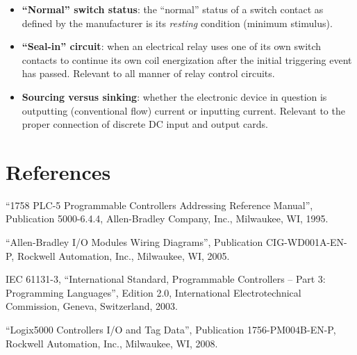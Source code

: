 \begin{itemize}
\item \textbf{``Normal'' switch status}: the ``normal'' status of a switch contact as defined by the manufacturer is its \textit{resting} condition (minimum stimulus).
\item \textbf{``Seal-in'' circuit}: when an electrical relay uses one of its own switch contacts to continue its own coil energization after the initial triggering event has passed.  Relevant to all manner of relay control circuits.
\item \textbf{Sourcing versus sinking}: whether the electronic device in question is outputting (conventional flow) current or inputting current.  Relevant to the proper connection of discrete DC input and output cards.
\end{itemize}













\filbreak
\section*{References}


\noindent
``1758 PLC-5 Programmable Controllers Addressing Reference Manual'', Publication 5000-6.4.4, Allen-Bradley Company, Inc., Milwaukee, WI, 1995.

\vskip 10pt

\noindent
``Allen-Bradley I/O Modules Wiring Diagrams'', Publication CIG-WD001A-EN-P, Rockwell Automation, Inc., Milwaukee, WI, 2005.

\vskip 10pt

\noindent
IEC 61131-3, ``International Standard, Programmable Controllers -- Part 3: Programming Languages'', Edition 2.0, International Electrotechnical Commission, Geneva, Switzerland, 2003.

\vskip 10pt

\noindent
``Logix5000 Controllers I/O and Tag Data'', Publication 1756-PM004B-EN-P, Rockwell Automation, Inc., Milwaukee, WI, 2008.

\vskip 10pt

